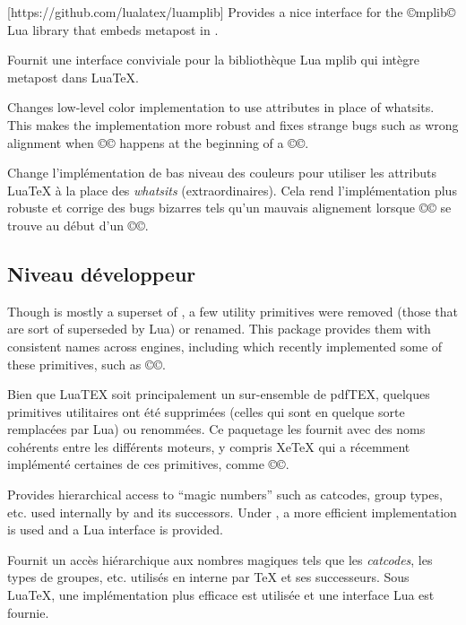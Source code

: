 \documentclass{lltxdoc}
\begin{document}
[https://github.com/lualatex/luamplib]
Provides a nice interface for the ©mplib© Lua library that embeds metapost in
\luatex.

Fournit une interface conviviale pour la bibliothèque Lua mplib qui intègre metapost dans LuaTeX.

Changes low-level color implementation to use \luatex attributes in place of
whatsits. This makes the implementation more robust and fixes strange bugs
such as wrong alignment when ©\color© happens at the beginning of a ©\vbox©.

Change l'implémentation de bas niveau des couleurs pour utiliser les attributs LuaTeX à la place des \emph{whatsits} ( extraordinaires\fg). Cela rend l'implémentation plus robuste et corrige des bugs bizarres tels qu'un mauvais alignement lorsque ©\color© se trouve au début d'un ©\vbox©.

\subsection{Niveau développeur}

Though \luatex is mostly a superset of \pdftex, a few utility primitives were
removed (those that are sort of superseded by Lua) or renamed. This package
provides them with consistent names across engines, including \xetex which
recently implemented some of these primitives, such as ©\strcmp©.

Bien que LuaTEX soit principalement un sur-ensemble de pdfTEX, quelques primitives utilitaires ont été supprimées (celles qui sont en quelque sorte remplacées par Lua) ou renommées. Ce paquetage les fournit avec des noms cohérents entre les différents moteurs, y compris XeTeX qui a récemment implémenté certaines de ces primitives, comme ©\strcmp©.
%

Provides hierarchical access to ``magic numbers'' such as catcodes, group
types, etc. used internally by \tex and its successors. Under \luatex, a more
efficient implementation is used and a Lua interface is provided.

Fournit un accès hiérarchique aux \og{}nombres magiques\fg{} tels que les \emph{catcodes}, les types de groupes, etc. utilisés en interne par TeX et ses successeurs. Sous LuaTeX, une implémentation plus efficace est utilisée et une interface Lua est fournie.
\end{document}
